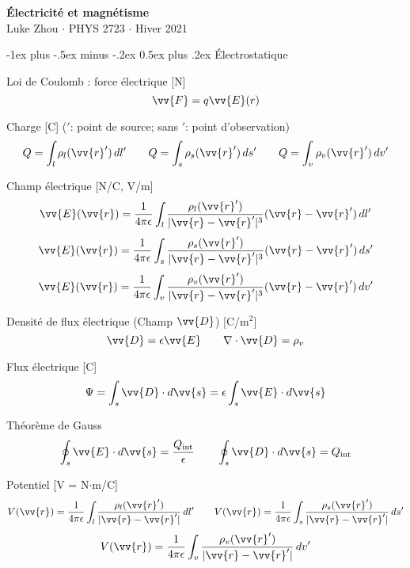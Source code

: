 \documentclass[10pt,landscape]{article}
\makeatletter
\renewcommand{\section}{\@startsection{section}{1}{0mm}%
                                {-1ex plus -.5ex minus -.2ex}%
                                {0.5ex plus .2ex}%
                                {\normalfont\large\bfseries}}
\makeatother
\begin{document}
\raggedright
\footnotesize
\begin{multicols}{3}


\setlength{\premulticols}{1pt}
\setlength{\postmulticols}{1pt}
\setlength{\multicolsep}{1pt}
\setlength{\columnsep}{2pt}

\begin{center}
     \Large{\textbf{Électricité et magnétisme}} \\
     \small{Luke Zhou $\cdot$ PHYS 2723 $\cdot$ Hiver 2021}
\end{center}

\section{Électrostatique}

Loi de Coulomb : force électrique [N]
 \[ \vv{F} = q\vv{E}(r) \] %

Charge  [C] ($'$: point de source; sans $'$: point d'observation)
\[  Q = \int_{l} \rho_l(\vv{r}') \,dl'  \qquad  Q = \int_{s} \rho_s(\vv{r}') \,ds'  \qquad Q = \int_{v} \rho_v(\vv{r}') \,dv'  \]

Champ électrique [N/C, V/m]
\[ \vv{E}(\vv{r}) = \frac{1}{4\pi\epsilon} \int_{l} \frac{\rho_l(\vv{r}')}{| \vv{r} - \vv{r}' |^3 } (\vv{r} - \vv{r}' )\,dl'  \]
%
\[\vv{E}(\vv{r}) = \frac{1}{4\pi\epsilon} \int_{s} \frac{\rho_s(\vv{r}')}{| \vv{r} - \vv{r}'|^3 } (\vv{r} - \vv{r}' )\,ds' \]
%
\[\vv{E}(\vv{r}) = \frac{1}{4\pi\epsilon} \int_{v} \frac{\rho_v(\vv{r}')}{| \vv{r} - \vv{r}' |^3 } (\vv{r} - \vv{r}' )\,dv'  \]

Densité de flux électrique (Champ $\vv{D}$)  [C/m${}^2$]
\[ \vv{D} = \epsilon\vv{E}
\qquad \nabla \cdot \vv{D} = \rho_v \]

Flux électrique [C]
\[ \Psi = \int_{s} \vv{D} \cdot d\vv{s} = \epsilon \int_{s} \vv{E} \cdot d\vv{s} \]

Théorème de Gauss
\[ \oint_s \vv{E}\cdot d\vv{s} = \frac{Q_\text{int}}{\epsilon}
\qquad  \oint_s \vv{D}\cdot d\vv{s} = Q_\text{int} \]

Potentiel [V = N$\cdot$m/C]
\[ {V}(\vv{r}) = \frac{1}{4\pi\epsilon} \int_{l} \frac{\rho_l(\vv{r}')}{| \vv{r} - \vv{r}' | } \,dl'
\qquad  {V}(\vv{r}) = \frac{1}{4\pi\epsilon} \int_{s} \frac{\rho_s(\vv{r}')}{| \vv{r} - \vv{r}'| } \,ds'  \]
%
\[ {V}(\vv{r}) = \frac{1}{4\pi\epsilon} \int_{v} \frac{\rho_v(\vv{r}')}{| \vv{r} - \vv{r}' | } \,dv'  \]


\end{multicols}
\end{document}
